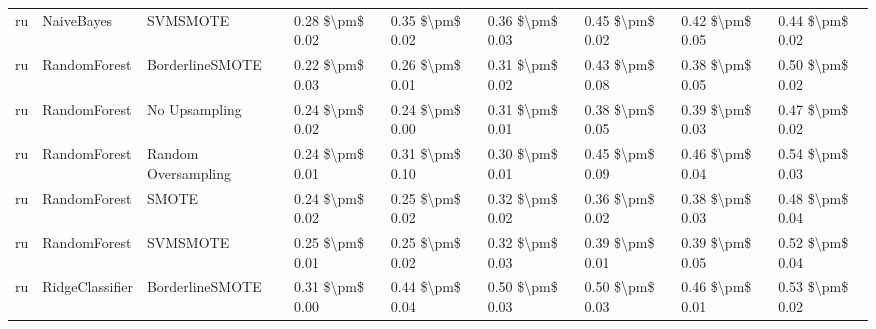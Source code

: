 \begin{tabular}{lllllllll}
      ru &                      NaiveBayes &                      SVMSMOTE & 0.28 \$\textbackslash pm\$ 0.02 &           0.35 \$\textbackslash pm\$ 0.02 &       0.36 \$\textbackslash pm\$ 0.03 &        0.45 \$\textbackslash pm\$ 0.02 &                         0.42 \$\textbackslash pm\$ 0.05 &     0.44 \$\textbackslash pm\$ 0.02 \\
      ru &                    RandomForest &               BorderlineSMOTE & 0.22 \$\textbackslash pm\$ 0.03 &           0.26 \$\textbackslash pm\$ 0.01 &       0.31 \$\textbackslash pm\$ 0.02 &        0.43 \$\textbackslash pm\$ 0.08 &                         0.38 \$\textbackslash pm\$ 0.05 &     0.50 \$\textbackslash pm\$ 0.02 \\
      ru &                    RandomForest &                 No Upsampling & 0.24 \$\textbackslash pm\$ 0.02 &           0.24 \$\textbackslash pm\$ 0.00 &       0.31 \$\textbackslash pm\$ 0.01 &        0.38 \$\textbackslash pm\$ 0.05 &                         0.39 \$\textbackslash pm\$ 0.03 &     0.47 \$\textbackslash pm\$ 0.02 \\
      ru &                    RandomForest &           Random Oversampling & 0.24 \$\textbackslash pm\$ 0.01 &           0.31 \$\textbackslash pm\$ 0.10 &       0.30 \$\textbackslash pm\$ 0.01 &        0.45 \$\textbackslash pm\$ 0.09 &                         0.46 \$\textbackslash pm\$ 0.04 &     0.54 \$\textbackslash pm\$ 0.03 \\
      ru &                    RandomForest &                         SMOTE & 0.24 \$\textbackslash pm\$ 0.02 &           0.25 \$\textbackslash pm\$ 0.02 &       0.32 \$\textbackslash pm\$ 0.02 &        0.36 \$\textbackslash pm\$ 0.02 &                         0.38 \$\textbackslash pm\$ 0.03 &     0.48 \$\textbackslash pm\$ 0.04 \\
      ru &                    RandomForest &                      SVMSMOTE & 0.25 \$\textbackslash pm\$ 0.01 &           0.25 \$\textbackslash pm\$ 0.02 &       0.32 \$\textbackslash pm\$ 0.03 &        0.39 \$\textbackslash pm\$ 0.01 &                         0.39 \$\textbackslash pm\$ 0.05 &     0.52 \$\textbackslash pm\$ 0.04 \\
      ru &                 RidgeClassifier &               BorderlineSMOTE & 0.31 \$\textbackslash pm\$ 0.00 &           0.44 \$\textbackslash pm\$ 0.04 &       0.50 \$\textbackslash pm\$ 0.03 &        0.50 \$\textbackslash pm\$ 0.03 &                         0.46 \$\textbackslash pm\$ 0.01 &     0.53 \$\textbackslash pm\$ 0.02 \\

\end{tabular}
